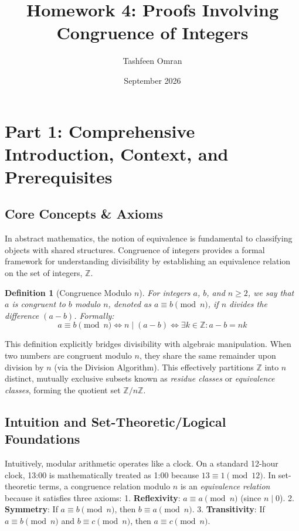 \documentclass[11pt]{article}
\title{\textbf{Homework 4: Proofs Involving Congruence of Integers}}
\author{Tashfeen Omran}
\date{September 2026}
\newtheorem{definition}[theorem]{Definition}
\begin{document}
\maketitle
\tableofcontents
\newpage

\section{Part 1: Comprehensive Introduction, Context, and Prerequisites}

\subsection{Core Concepts \& Axioms}
In abstract mathematics, the notion of equivalence is fundamental to classifying objects with shared structures. Congruence of integers provides a formal framework for understanding divisibility by establishing an equivalence relation on the set of integers, $\mathbb{Z}$. 

\begin{definition}[Congruence Modulo $n$]
For integers $a$, $b$, and $n \ge 2$, we say that $a$ is congruent to $b$ modulo $n$, denoted as $a \equiv b \pmod n$, if $n$ divides the difference $(a - b)$. 
Formally:
\[ a \equiv b \pmod n \iff n \mid (a - b) \iff \exists k \in \mathbb{Z} : a - b = nk \]
\end{definition}

This definition explicitly bridges divisibility with algebraic manipulation. When two numbers are congruent modulo $n$, they share the same remainder upon division by $n$ (via the Division Algorithm). This effectively partitions $\mathbb{Z}$ into $n$ distinct, mutually exclusive subsets known as \textit{residue classes} or \textit{equivalence classes}, forming the quotient set $\mathbb{Z} / n\mathbb{Z}$.

\subsection{Intuition and Set-Theoretic/Logical Foundations}
Intuitively, modular arithmetic operates like a clock. On a standard 12-hour clock, 13:00 is mathematically treated as 1:00 because $13 \equiv 1 \pmod{12}$. In set-theoretic terms, a congruence relation modulo $n$ is an \textit{equivalence relation} because it satisfies three axioms:
1. \textbf{Reflexivity}: $a \equiv a \pmod n$ (since $n \mid 0$).
2. \textbf{Symmetry}: If $a \equiv b \pmod n$, then $b \equiv a \pmod n$.
3. \textbf{Transitivity}: If $a \equiv b \pmod n$ and $b \equiv c \pmod n$, then $a \equiv c \pmod n$.
\end{document}
